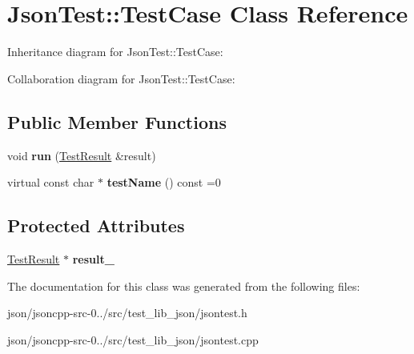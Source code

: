 \hypertarget{class_json_test_1_1_test_case}{\section{Json\+Test\+:\+:Test\+Case Class Reference}
\label{class_json_test_1_1_test_case}
}


Inheritance diagram for Json\+Test\+:\+:Test\+Case\+:


Collaboration diagram for Json\+Test\+:\+:Test\+Case\+:
\subsection*{Public Member Functions}
\begin{DoxyCompactItemize}
\item 
\hypertarget{class_json_test_1_1_test_case_aeed802e8e63a4aff20982feb1e0020e6}{void {\bfseries run} (\hyperlink{class_json_test_1_1_test_result}{Test\+Result} \&result)}\label{class_json_test_1_1_test_case_aeed802e8e63a4aff20982feb1e0020e6}

\item 
\hypertarget{class_json_test_1_1_test_case_a6892acc0e07c3c0739480bfb5ff279dc}{virtual const char $\ast$ {\bfseries test\+Name} () const =0}\label{class_json_test_1_1_test_case_a6892acc0e07c3c0739480bfb5ff279dc}

\end{DoxyCompactItemize}
\subsection*{Protected Attributes}
\begin{DoxyCompactItemize}
\item 
\hypertarget{class_json_test_1_1_test_case_a9d48792eea636125687bccc5760cc791}{\hyperlink{class_json_test_1_1_test_result}{Test\+Result} $\ast$ {\bfseries result\+\_\+}}\label{class_json_test_1_1_test_case_a9d48792eea636125687bccc5760cc791}

\end{DoxyCompactItemize}


The documentation for this class was generated from the following files\+:\begin{DoxyCompactItemize}
\item 
json/jsoncpp-\/src-\/0../src/test\+\_\+lib\+\_\+json/jsontest.\+h\item 
json/jsoncpp-\/src-\/0../src/test\+\_\+lib\+\_\+json/jsontest.\+cpp\end{DoxyCompactItemize}
